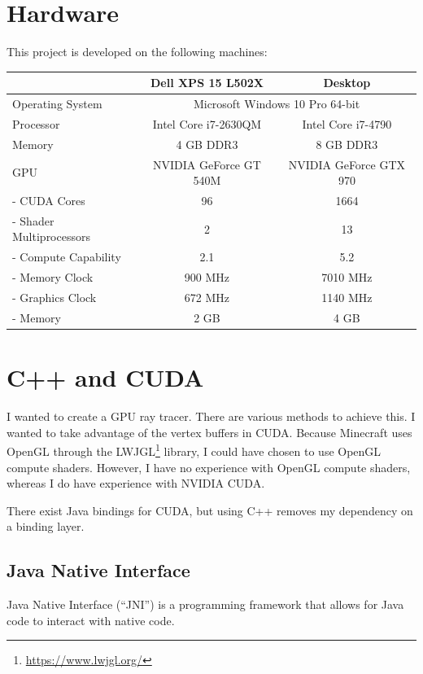 \documentclass[]{article}
\begin{document}
\section{Hardware}
This project is developed on the following machines:

\begin{center}
  \begin{tabular}{| l || c | c |} \hline
    & Dell XPS 15 L502X & Desktop \\ \hline
    Operating System & \multicolumn{2}{c|}{Microsoft Windows 10 Pro 64-bit} \\ \hline
    Processor & Intel Core i7-2630QM & Intel Core i7-4790 \\ \hline
    Memory & 4 GB DDR3 & 8 GB DDR3 \\ \hline \hline
    GPU & NVIDIA GeForce GT 540M & NVIDIA GeForce GTX 970\\ \hline
    - CUDA Cores & 96 & 1664 \\ \hline
    - Shader Multiprocessors & 2 & 13 \\ \hline
    - Compute Capability & 2.1 & 5.2 \\ \hline
    - Memory Clock & 900 MHz & 7010 MHz \\ \hline
    - Graphics Clock & 672 MHz & 1140 MHz \\ \hline
    - Memory & 2 GB & 4 GB \\ \hline %
  \end{tabular}
\end{center}

\section{C++ and CUDA}
I wanted to create a GPU ray tracer.
There are various methods to achieve this. 
I wanted to take advantage of the vertex buffers in CUDA.
Because Minecraft uses OpenGL through the LWJGL\footnote{\url{https://www.lwjgl.org/}} library, I could have chosen to use OpenGL compute shaders.
However, I have no experience with OpenGL compute shaders, whereas I do have experience with NVIDIA CUDA.

There exist Java bindings for CUDA, but using C++ removes my dependency on a binding layer.
\subsection{Java Native Interface}
Java Native Interface (\enquote{JNI}) is a programming framework that allows for Java code to interact with native code.
\end{document}
